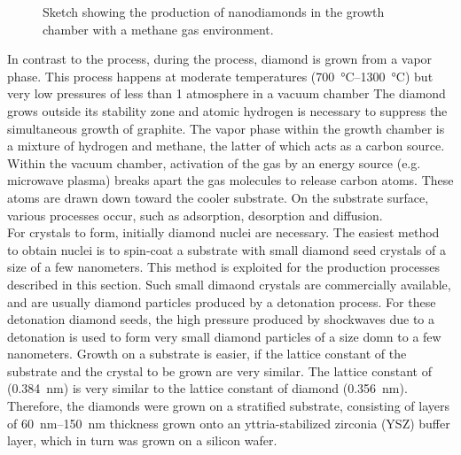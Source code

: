 	\begin{figure}[tp]
		\centering
		\caption{Sketch showing the production of \CVD nanodiamonds in the growth chamber with a methane gas environment.}
		\label{fig::cvd_sketch}
	\end{figure}

	In contrast to the \HPHT process,  during the \cvd process, diamond is grown from a vapor phase.
	This process happens at moderate temperatures (\SIrange{700}{1300}{\celsius}) but very low pressures of less than 1 atmosphere in a vacuum chamber \cite{}
	The diamond grows outside its stability zone and atomic hydrogen is necessary to suppress the simultaneous growth of graphite.
	The vapor phase within the growth chamber is a mixture of hydrogen and methane, the latter of which acts as a carbon source.
	Within the vacuum chamber, activation of the gas by an energy source (e.g. microwave plasma) breaks apart the gas molecules to release carbon atoms. 
	These atoms are drawn down toward the cooler substrate.
	On the substrate surface, various processes occur, such as adsorption, desorption and diffusion.
	\\
	For crystals to form, initially diamond nuclei are necessary.
	The easiest method to obtain nuclei is to spin-coat a substrate with small diamond seed crystals of a size of a few nanometers. 
	This method is exploited for the production processes described in this section.
	Such small dimaond crystals are commercially available, and are usually diamond particles produced by a detonation process.
	For these detonation diamond seeds, the high pressure produced by shockwaves due to a detonation is used to form very small diamond particles of a size domn to a few nanometers.
	Growth on a substrate is easier, if the lattice constant of the substrate and the crystal to be grown are very similar.
	The lattice constant of \ir (\SI{0.384}{nm}\cite{Arblaster2010}) is very similar to the lattice constant of diamond (\SI{0.356}{nm}\cite{Davis1993}).
	Therefore, the diamonds were grown on a stratified substrate, consisting of \ir layers of \SIrange{60}{150}{nm} thickness grown onto an yttria-stabilized zirconia (YSZ) buffer layer, which in turn was grown on a silicon wafer.


